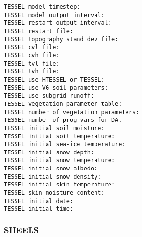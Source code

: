  \begin{Verbatim}[frame=single]
TESSEL model timestep:
TESSEL model output interval:
TESSEL restart output interval:
TESSEL restart file:
TESSEL topography stand dev file:
TESSEL cvl file:
TESSEL cvh file:
TESSEL tvl file:
TESSEL tvh file:
TESSEL use HTESSEL or TESSEL:
TESSEL use VG soil parameters:
TESSEL use subgrid runoff:
TESSEL vegetation parameter table:
TESSEL number of vegetation parameters:
TESSEL number of prog vars for DA:
TESSEL initial soil moisture:
TESSEL initial soil temperature:
TESSEL initial sea-ice temperature:
TESSEL initial snow depth:
TESSEL initial snow temperature:
TESSEL initial snow albedo:
TESSEL initial snow density:
TESSEL initial skin temperature:
TESSEL skin moisture content:
TESSEL initial date:
TESSEL initial time:
 \end{Verbatim}
 

 
 
 \subsubsection{SHEELS} \label{sssec:lsm_sheels}
 

 
  

  

  

  

  

  

  

  

  

  

  

  

  

  

